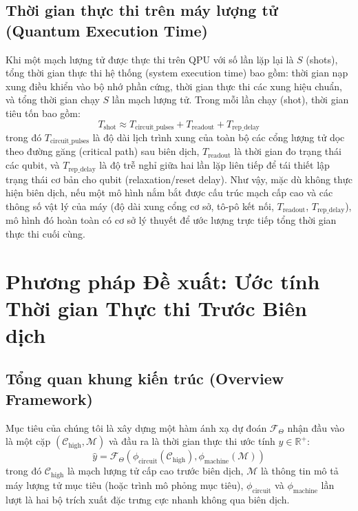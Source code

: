 \documentclass[11pt, a4paper]{article}
\begin{document}
\subsection{Thời gian thực thi trên máy lượng tử (Quantum Execution Time)}
Khi một mạch lượng tử được thực thi trên QPU với số lần lặp lại là $S$ (shots), tổng thời gian thực thi hệ thống (system execution time) bao gồm: thời gian nạp xung điều khiển vào bộ nhớ phần cứng, thời gian thực thi các xung hiệu chuẩn, và tổng thời gian chạy $S$ lần mạch lượng tử. Trong mỗi lần chạy (shot), thời gian tiêu tốn bao gồm:
\begin{equation}
    T_{\text{shot}} \approx T_{\text{circuit\_pulses}} + T_{\text{readout}} + T_{\text{rep\_delay}}
\end{equation}
trong đó $T_{\text{circuit\_pulses}}$ là độ dài lịch trình xung của toàn bộ các cổng lượng tử dọc theo đường găng (critical path) sau biên dịch, $T_{\text{readout}}$ là thời gian đo trạng thái các qubit, và $T_{\text{rep\_delay}}$ là độ trễ nghỉ giữa hai lần lặp liên tiếp để tái thiết lập trạng thái cơ bản cho qubit (relaxation/reset delay). Như vậy, mặc dù không thực hiện biên dịch, nếu một mô hình nắm bắt được cấu trúc mạch cấp cao và các thông số vật lý của máy (độ dài xung cổng cơ sở, tô-pô kết nối, $T_{\text{readout}}$, $T_{\text{rep\_delay}}$), mô hình đó hoàn toàn có cơ sở lý thuyết để ước lượng trực tiếp tổng thời gian thực thi cuối cùng.

\section{Phương pháp Đề xuất: Ước tính Thời gian Thực thi Trước Biên dịch}

\subsection{Tổng quan khung kiến trúc (Overview Framework)}
Mục tiêu của chúng tôi là xây dựng một hàm ánh xạ dự đoán $\mathcal{F}_{\Theta}$ nhận đầu vào là một cặp $(\mathcal{C}_{\text{high}}, \mathcal{M})$ và đầu ra là thời gian thực thi ước tính $\hat{y} \in \mathbb{R}^+$:
\begin{equation}
    \hat{y} = \mathcal{F}_{\Theta}\left( \phi_{\text{circuit}}(\mathcal{C}_{\text{high}}), \phi_{\text{machine}}(\mathcal{M}) \right)
\end{equation}
trong đó $\mathcal{C}_{\text{high}}$ là mạch lượng tử cấp cao trước biên dịch, $\mathcal{M}$ là thông tin mô tả máy lượng tử mục tiêu (hoặc trình mô phỏng mục tiêu), $\phi_{\text{circuit}}$ và $\phi_{\text{machine}}$ lần lượt là hai bộ trích xuất đặc trưng cực nhanh không qua biên dịch.
\end{document}
